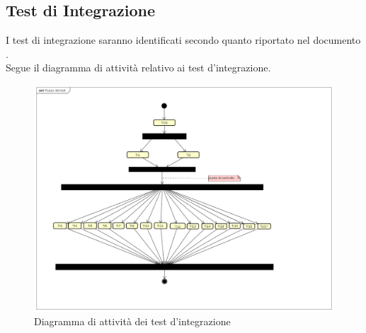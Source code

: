 \subsection{Test di Integrazione}
I test di integrazione saranno identificati secondo quanto riportato nel documento \NPdoc{}.\\
Segue il diagramma di attività relativo ai test d'integrazione.
\begin{figure}[h]
	\centering
	\includegraphics[width=\textwidth,height=\textheight,keepaspectratio]{FlussoIntegrazione.png}
	\caption{Diagramma di attività dei test d'integrazione}
\end{figure}
\normalsize
